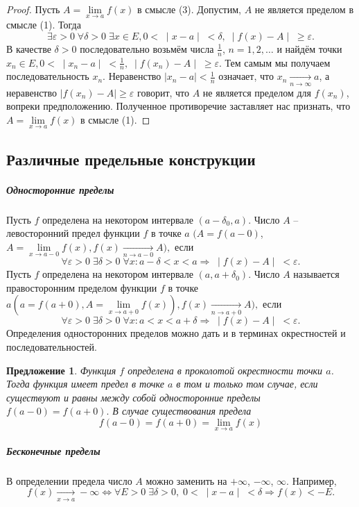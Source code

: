 \documentclass{article}
\newtheorem{Proposition}{Предложение}[section]
\begin{document}
\begin{proof}
Пусть $A=\lim\limits_{x \to a} f(x)$ в смысле (3). Допустим, $A$ не является пределом в смысле (1). Тогда
$$\exists\varepsilon > 0 \; \forall \delta > 0 \; \exists x \in E, 0 < \;  \mid x - a \mid \; < \delta, \; \mid f(x) - A \mid \; \geq \varepsilon.$$
В качестве $\delta > 0 $ последовательно возьмём числа $\frac1{n}$, $n = 1, 2, \ldots$ и найдём точки $x_n \in E, 0 < \; \mid x_n - a \mid \; < \frac1{n}, \; \mid f(x_n) - A \mid \; \geq \varepsilon$. Тем самым мы получаем последовательность ${x_n}$. Неравенство $\mid x_n - a \mid < \frac1{n} $ означает, что $x_n \xrightarrow[n\rightarrow\infty]{} a$, а неравенство $\mid f(x_n) - A \mid \geq \varepsilon$ говорит, что $A$ не является пределом для ${f(x_n)}$, вопреки предположению. Полученное противоречие заставляет нас признать, что $A=\lim\limits_{x \to a} f(x)$ в смысле (1).
\end{proof}
\subsection{Различные предельные конструкции}
\subparagraph{Односторонние пределы}
Пусть $f$ определена на некотором интервале $(a - \delta_0, a)$.
Число $A$ -- левосторонний предел функции $f$ в точке $a$ $(A = f(a - 0)$, $A=\lim\limits_{x \to a - 0} f(x), f(x) \xrightarrow[n\rightarrow a-0]{} A),$ если
$$ \forall \varepsilon > 0 \; \exists \delta > 0 \; \forall x: a - \delta < x < a \Rightarrow \; \mid f(x) - A \mid \; < \varepsilon.$$
Пусть $f$ определена на некотором интервале $(a, a + \delta_0)$.
Число $A$ называется правосторонним пределом функции $f$ в точке $a (a = f(a+0), A=\lim\limits_{x \to a+0} f(x)), f(x) \xrightarrow[n\rightarrow a+0]{} A),$ если
$$ \forall \varepsilon > 0 \; \exists \delta > 0 \; \forall x: a < x < a + \delta \Rightarrow \; \mid f(x) - A \mid \; < \varepsilon.$$
Определения односторонних пределов можно дать и в терминах окрестностей и последовательностей.
\begin{Proposition}
Функция $f$ определена в проколотой окрестности точки $a$.
Тогда функция имеет предел в точке $a$ в том и только том случае, если существуют и равны между собой односторонние пределы $f(a-0) = f(a+0).$ В случае существования предела
$$f(a-0) = f(a+0) = \lim\limits_{x \to a} f(x)$$
\end{Proposition}

\subparagraph{Бесконечные пределы}
В определении предела число $A$ можно заменить на $+\infty$, $-\infty$, $\infty$. Например,
$$f(x) \xrightarrow[x\rightarrow a]{} -\infty \Leftrightarrow \forall E > 0 \; \exists \delta > 0, \; 0 < \; \mid x - a \mid \; < \delta \Rightarrow f(x) < -E.$$
\end{document}
